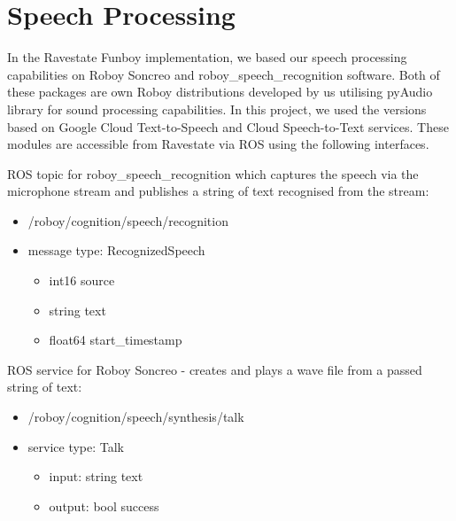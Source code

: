\section{Speech Processing}

In the Ravestate Funboy implementation, we based our speech processing capabilities on Roboy Soncreo and roboy\_speech\_recognition software. Both of these packages are own Roboy distributions developed by us utilising pyAudio library for sound processing capabilities. In this project, we used the versions based on Google Cloud Text-to-Speech and Cloud Speech-to-Text services. These modules are accessible from Ravestate via ROS using the following interfaces.

ROS topic for roboy\_speech\_recognition which captures the speech via the microphone stream and publishes a string of text recognised from the stream:
\begin{itemize}
    \item /roboy/cognition/speech/recognition
    \item message type: RecognizedSpeech
    \begin{itemize}
        \item int16 source
        \item string text
        \item float64 start\_timestamp
    \end{itemize}
\end{itemize}
ROS service for Roboy Soncreo - creates and plays a wave file from a passed string of text:
\begin{itemize}
    \item /roboy/cognition/speech/synthesis/talk
    \item service type: Talk
    \begin{itemize}
        \item input: string text
        \item output: bool success
    \end{itemize}
\end{itemize}